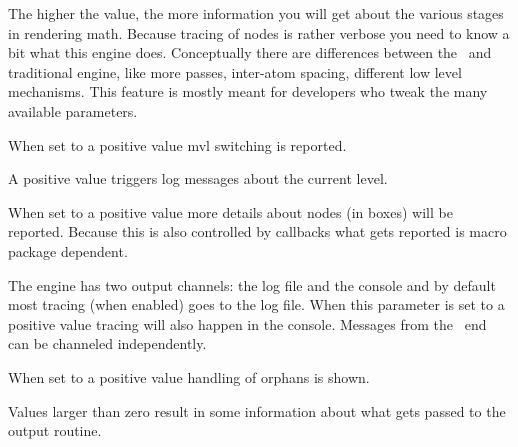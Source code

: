 \stopnewprimitive

\startnewprimitive[title={\prm {tracingmath}}]

The higher the value, the more information you will get about the various stages
in rendering math. Because tracing of nodes is rather verbose you need to know a
bit what this engine does. Conceptually there are differences between the
\LUAMETATEX\ and traditional engine, like more passes, inter-atom spacing,
different low level mechanisms. This feature is mostly meant for developers who
tweak the many available parameters.

\stopnewprimitive

\startnewprimitive[title={\prm {tracingmvl}}]

When set to a positive value mvl switching is reported.

\stopnewprimitive

\startoldprimitive[title={\prm {tracingnesting}}]

A positive value triggers log messages about the current level.

\stopoldprimitive

\startnewprimitive[title={\prm {tracingnodes}}]

When set to a positive value more details about nodes (in boxes) will be
reported. Because this is also controlled by callbacks what gets reported is
macro package dependent.

\stopnewprimitive

\startoldprimitive[title={\prm {tracingonline}}]

The engine has two output channels: the log file and the console and by default
most tracing (when enabled) goes to the log file. When this parameter is set to a
positive value tracing will also happen in the console. Messages from the \LUA\
end can be channeled independently.

\stopoldprimitive

\startnewprimitive[title={\prm {tracingorphans}}]

When set to a positive value handling of orphans is shown.

\stopnewprimitive

\startoldprimitive[title={\prm {tracingoutput}}]

Values larger than zero result in some information about what gets passed to the
output routine.

\stopoldprimitive

\startoldprimitive[title={\prm {tracingpages}}]

